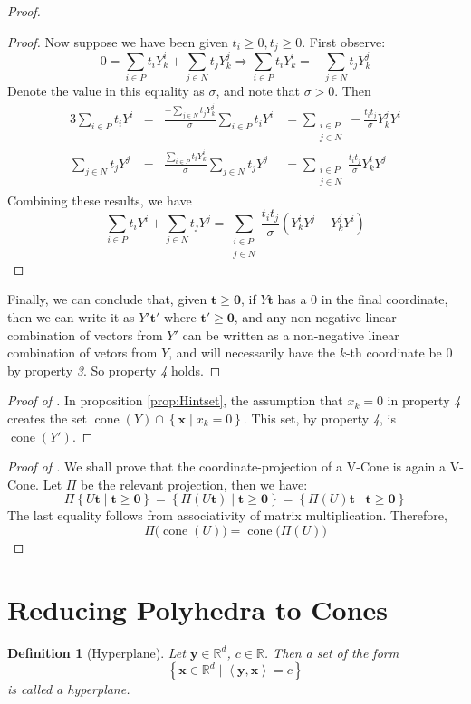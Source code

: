 \documentclass[fleqn]{article}
\renewcommand{\vec}[1]{\mathbf{#1}}
\newcommand{\set}[1]{\left\{#1\right\}}
\DeclareMathOperator{\cone}{cone}
\newcommand{\ip}[2]{\left\langle #1, #2 \right\rangle}
\newcommand{\R}{\mathbb{R}}
\newcommand{\0}{\vec{0}}
\newcommand{\x}{\vec{x}}
\newcommand{\y}{\vec{y}}
\renewcommand{\t}{\vec{t}}
\newcommand{\st}{\;|\;}
\newcommand{\xv}{\x \in \R^d}
\newcommand{\Yi}{Y^i_{k}}
\newcommand{\Yj}{Y^j_{k}}
\newcommand{\Psum}{\sum_{i\in P}}
\newcommand{\Nsum}{\sum_{j\in N}}
\newcommand{\NPsum}{\sum_{\substack{i\in P \\ j\in N}}}
\newtheorem{Def}{Definition}
\begin{document}
\begin{proof}
\begin{proof}
Now suppose we have been given $t_i \geq 0, t_j \geq 0$.  First observe:
\[ 0 = \Psum t_i\Yi + \Nsum t_j\Yj \Rightarrow \Psum t_i\Yi = -\Nsum t_j\Yj\]
Denote the value in this equality as $\sigma$, and note that $\sigma > 0$.  Then
\begin{alignat*}{3} 
\Psum t_i Y^i &= &\frac{-\Nsum t_j \Yj}{\sigma}\Psum t_i Y^i &= 
                     \NPsum -\frac{t_i t_j}{\sigma}\Yj Y^i \\
\Nsum t_j Y^j &= &\frac{\Psum t_i \Yi}{\sigma}\Nsum t_j Y^j &= 
                     \NPsum \frac{t_i t_j}{\sigma}\Yi Y^j
\end{alignat*}
Combining these results, we have
\[ \Psum t_i Y^i + \Nsum t_j Y^j = 
                     \NPsum \frac{t_i t_j}{\sigma}(\Yi Y^j - \Yj Y^i) \]
\end{proof}
Finally, we can conclude that, given $\t \geq \0$, if $ Y\t$ has a $0$ in the final coordinate, then we can write it as $ Y'\t'$ where $\t' \geq \0$, and any non-negative linear combination of vectors from $Y'$ can be written as a non-negative linear combination of vetors from $Y$, and will necessarily have the $k$-th coordinate be $0$ by property \textit{3}.  So property \textit{4} holds.
\end{proof}

\begin{proof}[Proof of {\Hint}]
In proposition \ref{prop:Hintset}, the assumption that $x_k = 0$ in property \textit{4} creates the set $\cone(Y) \cap \set{\x \st x_k = 0}$.  This set, by property \textit{4}, is $\cone(Y')$.
\end{proof}

\begin{proof}[Proof of {\Hproj}]
  We shall prove that the coordinate-projection of a V-Cone is again a V-Cone.  Let $\Pi$ be the relevant projection, then we have:
  \[ \Pi\set{U\t \st \t \geq \0} = \set{\Pi(U\t) \st \t \geq \0} = 
        \set{\Pi(U)\t \st \t \geq \0} \]
The last equality follows from associativity of matrix multiplication.  Therefore,
  \[ \Pi\big(\cone(U)\big) = \cone\big(\Pi(U)\big) \]
\end{proof}

\section{Reducing Polyhedra to Cones}

\begin{Def}[Hyperplane]
  Let $\y \in \R^d$, $c \in \R$.  Then a set of the form
  \[ \set{\xv \st \ip{\y}{\x} = c} \]
  is called a \em{hyperplane}.
\end{Def}
\end{document}
